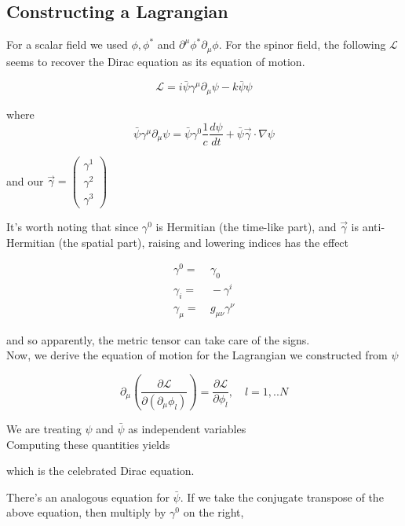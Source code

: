 \documentclass[11pt]{article}
\newcommand{\lag}{\mathcal{L}}
\begin{document}
\subsection*{Constructing a Lagrangian}
For a scalar field we used $\phi, \phi^*$ and $\partial^\mu \phi^* \partial_\mu\phi$. For the spinor field, the following $\lag$ seems to recover the Dirac equation as its equation of motion.

	\[ \lag = i\bar{\psi}\gamma^\mu\partial_\mu\psi - k\bar{\psi}\psi \]
	
	where $$\bar{\psi}\gamma^\mu\partial_\mu\psi = \bar{\psi}\gamma^0 \frac{1}{c}\frac{d\psi}{dt} + \bar{\psi}\vec{\gamma}\cdot \nabla \psi$$
	
	and our $\vec{\gamma} = \begin{pmatrix}\gamma^1 \\ \gamma^2 \\ \gamma^3 \end{pmatrix}$

It's worth noting that since $\gamma^0$ is Hermitian (the time-like part), and
$\vec{\gamma}$ is anti-Hermitian (the spatial part), raising and lowering indices has the effect

\begin{align*}
	\gamma^0 = &\ \gamma_0\\
	\gamma_i =&\ -\gamma^i \\
	\gamma_\mu =&\ g_{\mu\nu} \gamma^\nu
\end{align*}

and so apparently, the metric tensor can take care of the signs. \\

Now, we derive the equation of motion for the Lagrangian we constructed from $\psi$

\[ \partial_\mu\left(\frac{\partial \lag}{ \partial(\partial_\mu\phi_l)}\right) = \frac{\partial\lag}{\partial \phi_l}, \quad l=1, .. N\]

We are treating $\psi$ and $\bar{\psi}$ as independent variables\\

Computing these quantities yields

\begin{center}  \end{center} which is the celebrated Dirac equation.

There's an analogous equation for $\bar{\psi}$. If we take the conjugate transpose of the above equation, then multiply by $\gamma^0$ on the right, 
\end{document}
